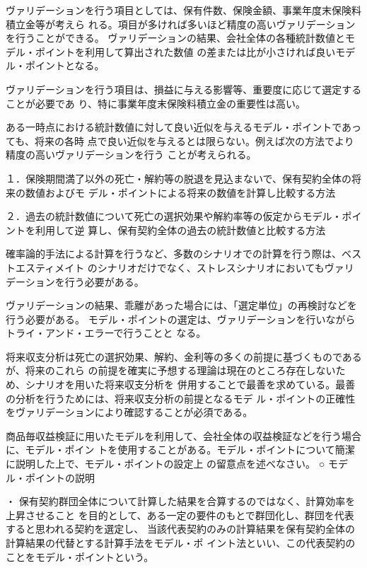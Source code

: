 \documentclass[report,gutter=10mm,fore-edge=10mm,uplatex,dvipdfmx]{jlreq}
\begin{document}
ヴァリデーションを行う項目としては、保有件数、保険金額、事業年度末保険料積立金等が考えら
れる。項目が多ければ多いほど精度の高いヴァリデーションを行うことができる。
ヴァリデーションの結果、会社全体の各種統計数値とモデル・ポイントを利用して算出された数値
の差または比が小さければ良いモデル・ポイントとなる。

ヴァリデーションを行う項目は、損益に与える影響等、重要度に応じて選定することが必要であ
り、特に事業年度末保険料積立金の重要性は高い。

ある一時点における統計数値に対して良い近似を与えるモデル・ポイントであっても、将来の各時
点で良い近似を与えるとは限らない。例えば次の方法でより精度の高いヴァリデーションを行う
ことが考えられる。

１．保険期間満了以外の死亡・解約等の脱退を見込まないで、保有契約全体の将来の数値およびモ
デル・ポイントによる将来の数値を計算し比較する方法

２．過去の統計数値について死亡の選択効果や解約率等の仮定からモデル・ポイントを利用して逆
算し、保有契約全体の過去の統計数値と比較する方法

確率論的手法による計算を行うなど、多数のシナリオでの計算を行う際は、ベストエスティメイト
のシナリオだけでなく、ストレスシナリオにおいてもヴァリデーションを行う必要がある。

ヴァリデーションの結果、乖離があった場合には、「選定単位」の再検討などを行う必要がある。
モデル・ポイントの選定は、ヴァリデーションを行いながらトライ・アンド・エラーで行うことと
なる。

将来収支分析は死亡の選択効果、解約、金利等の多くの前提に基づくものであるが、将来のこれら
の前提を確実に予想する理論は現在のところ存在しないため、シナリオを用いた将来収支分析を
併用することで最善を求めている。最善の分析を行うためには、将来収支分析の前提となるモデ
ル・ポイントの正確性をヴァリデーションにより確認することが必須である。

商品毎収益検証に用いたモデルを利用して、会社全体の収益検証などを行う場合に、モデル・ポイン
トを使用することがある。モデル・ポイントについて簡潔に説明した上で、モデル・ポイントの設定上
の留意点を述べなさい。
\answer{}
○ モデル・ポイントの説明

・ 保有契約群団全体について計算した結果を合算するのではなく、計算効率を上昇させること
を目的として、ある一定の要件のもとで群団化し、群団を代表すると思われる契約を選定し、
当該代表契約のみの計算結果を保有契約全体の計算結果の代替とする計算手法をモデル・ポ
イント法といい、この代表契約のことをモデル・ポイントという。
\end{document}
